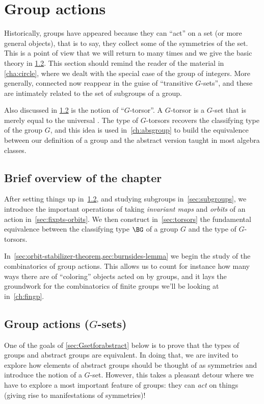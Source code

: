 \chapter{Group actions}
\label{ch:actions}

Historically, groups have appeared because they can ``act'' on a set
(or more general objects), that is to say, they collect some of the
symmetries of the set. This is a point of view that we will return to
many times and we give the basic theory in \cref{sec:gsets}.
This section should remind the reader of the material in \cref{cha:circle},
where we dealt with the special case of the group of integers.
More generally, connected \coverings now reappear in the guise of
``transitive $G$-sets'', and these are intimately related to
the set of subgroups of a group.

Also discussed in \cref{sec:gsets} is the notion of ``$G$-torsor''.
A $G$-torsor is a $G$-set that is merely equal to the universal \covering.
The type of $G$-torsors recovers the classifying type of the group $G$,
and this idea is used in~\cref{ch:absgroup} to build the equivalence between our definition of a group and the abstract version taught in most algebra classes.

\section{Brief overview of the chapter}

After setting things up in~\cref{sec:gsets}, and
studying subgroups in~\cref{sec:subgroups},
we introduce the important
operations of taking \emph{invariant maps} and \emph{orbits} of an action
in~\cref{sec:fixpts-orbits}.
We then construct in~\cref{sec:torsors}
the fundamental equivalence between the classifying type $\BG$ of a group $G$
and the type of $G$-torsors.

In~\cref{sec:orbit-stabilizer-theorem,sec:burnsides-lemma} we
begin the study of the combinatorics of group actions.
This allows us to count for instance how many ways there are of ``coloring''
objects acted on by groups,
and it lays the groundwork for the combinatorics of finite groups
we'll be looking at in~\cref{ch:fingp}.

\section{Group actions ($G$-sets)}
\label{sec:gsets}

One of the goals of \cref{sec:Gsetforabstract} below
is to prove that the types of groups and abstract groups are equivalent.
In doing that, we are invited to explore how elements of
abstract groups should be
thought of as symmetries and introduce the notion of a $G$-set.
However, this takes a pleasant detour where we have to explore a
most important feature of groups: they can \emph{act} on things
(giving rise to manifestations of symmetries)!

